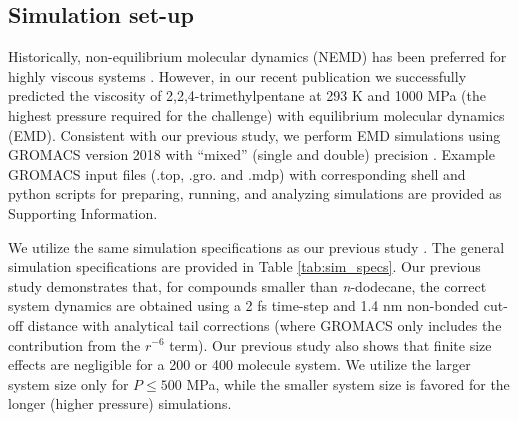\documentclass[preprint,review,12pt]{elsarticle}
\begin{document}
	
	
	
	
	\subsection{Simulation set-up}
		
	Historically, non-equilibrium molecular dynamics (NEMD) has been preferred for highly viscous systems \cite{McCabe2001,Liu2015}. However, in our recent publication we successfully predicted the viscosity of 2,2,4-trimethylpentane at 293 K and 1000 MPa (the highest pressure required for the challenge) with equilibrium molecular dynamics (EMD). Consistent with our previous study, we perform EMD simulations using GROMACS version 2018 with ``mixed'' (single and double) precision \cite{GROMACS_2018}. Example GROMACS input files (.top, .gro. and .mdp) with corresponding shell and python scripts for preparing, running, and analyzing simulations are provided as Supporting Information.
	
	
	
    We utilize the same simulation specifications as our previous study \cite{Postdoc_3}. The general simulation specifications are provided in Table \ref{tab:sim_specs}. Our previous study demonstrates that, for compounds smaller than \textit{n}-dodecane, the correct system dynamics are obtained using a 2 fs time-step and 1.4 nm non-bonded cut-off distance with analytical tail corrections (where GROMACS only includes the contribution from the $r^{-6}$ term). Our previous study also shows that finite size effects are negligible for a 200 or 400 molecule system. We utilize the larger system size only for $P \le 500$ MPa, while the smaller system size is favored for the longer (higher pressure) simulations.
	 
\end{document}
